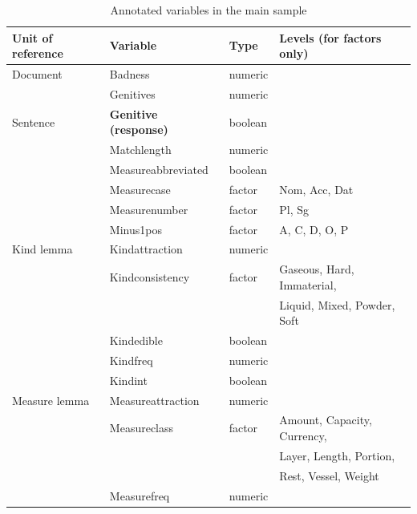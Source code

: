\documentclass[USenglish]{article}
\begin{document}
\begin{table}
  \centering
  \begin{tabular}{llll}
    Unit of reference & Variable                  & Type    & Levels (for factors only)   \\
    \midrule
    Document       & Badness                      & numeric &                             \\
                   & Genitives                    & numeric &                             \\
    Sentence       & \textbf{Genitive (response)} & boolean &                             \\
                   & Matchlength                  & numeric &                             \\
                   & Measureabbreviated           & boolean &                             \\
                   & Measurecase                  & factor  & Nom, Acc, Dat               \\
                   & Measurenumber                & factor  & Pl, Sg                      \\
                   & Minus1pos                    & factor  & A, C, D, O, P               \\
    Kind lemma     & Kindattraction               & numeric &                             \\
                   & Kindconsistency              & factor  & Gaseous, Hard, Immaterial,  \\
                   &                              &         & Liquid, Mixed, Powder, Soft \\
                   & Kindedible                   & boolean &                             \\
                   & Kindfreq                     & numeric &                             \\
                   & Kindint                      & boolean &                             \\
    Measure lemma  & Measureattraction            & numeric &                             \\
                   & Measureclass                 & factor  & Amount, Capacity, Currency, \\
                   &                              &         & Layer, Length, Portion,     \\
                   &                              &         & Rest, Vessel, Weight        \\
                   & Measurefreq                  & numeric &                             \\
  \end{tabular}
  \caption{Annotated variables in the main sample}
  \label{tab:variables}
\end{table}
\end{document}
